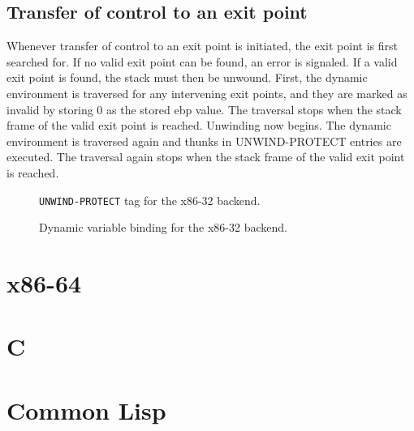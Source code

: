 \subsection{Transfer of control to an exit point}

Whenever transfer of control to an exit point is initiated, the exit
point is first searched for.  If no valid exit point can be found, an
error is signaled.  If a valid exit point is found, the stack must
then be unwound.  First, the dynamic environment is traversed for any
intervening exit points, and they are marked as invalid by storing 0
as the stored ebp value.  The traversal stops when the stack frame of
the valid exit point is reached.  Unwinding now begins.  The dynamic
environment is traversed again and thunks in UNWIND-PROTECT entries
are executed.  The traversal again stops when the stack frame of the
valid exit point is reached.

\begin{figure}
\begin{center}
\end{center}
\caption{\label{fig-x86-32-unwind-protect}
\texttt{UNWIND-PROTECT} tag for the x86-32 backend.}
\end{figure}

\begin{figure}
\begin{center}
\end{center}
\caption{\label{fig-x86-32-dynamic-binding}
Dynamic variable binding for the x86-32 backend.}
\end{figure}

\section{x86-64}

\section{C}

\section{Common Lisp}


